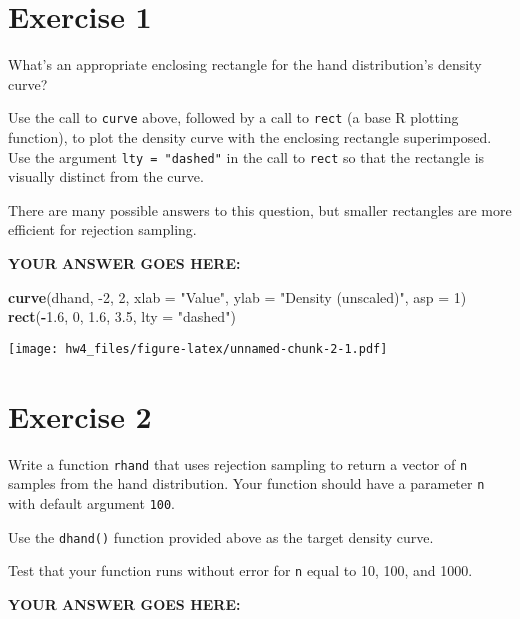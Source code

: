 \documentclass[
]{article}
\newenvironment{Shaded}{\begin{snugshade}}{\end{snugshade}}
\newcommand{\DataTypeTok}[1]{\textcolor[rgb]{0.13,0.29,0.53}{#1}}
\newcommand{\DecValTok}[1]{\textcolor[rgb]{0.00,0.00,0.81}{#1}}
\newcommand{\FloatTok}[1]{\textcolor[rgb]{0.00,0.00,0.81}{#1}}
\newcommand{\KeywordTok}[1]{\textcolor[rgb]{0.13,0.29,0.53}{\textbf{#1}}}
\newcommand{\NormalTok}[1]{#1}
\newcommand{\OperatorTok}[1]{\textcolor[rgb]{0.81,0.36,0.00}{\textbf{#1}}}
\newcommand{\StringTok}[1]{\textcolor[rgb]{0.31,0.60,0.02}{#1}}
\begin{document}
\hypertarget{exercise-1}{%
\section{Exercise 1}\label{exercise-1}}

What's an appropriate enclosing rectangle for the hand distribution's
density curve?

Use the call to \texttt{curve} above, followed by a call to
\texttt{rect} (a base R plotting function), to plot the density curve
with the enclosing rectangle superimposed. Use the argument
\texttt{lty\ =\ "dashed"} in the call to \texttt{rect} so that the
rectangle is visually distinct from the curve.

There are many possible answers to this question, but smaller rectangles
are more efficient for rejection sampling.

\textbf{YOUR ANSWER GOES HERE:}

\begin{Shaded}
\begin{Highlighting}[]
\KeywordTok{curve}\NormalTok{(dhand, }\DecValTok{{-}2}\NormalTok{, }\DecValTok{2}\NormalTok{, }\DataTypeTok{xlab =} \StringTok{"Value"}\NormalTok{, }\DataTypeTok{ylab =} \StringTok{"Density (unscaled)"}\NormalTok{, }\DataTypeTok{asp =} \DecValTok{1}\NormalTok{)}
\KeywordTok{rect}\NormalTok{(}\OperatorTok{{-}}\FloatTok{1.6}\NormalTok{, }\DecValTok{0}\NormalTok{, }\FloatTok{1.6}\NormalTok{, }\FloatTok{3.5}\NormalTok{, }\DataTypeTok{lty =} \StringTok{"dashed"}\NormalTok{)}
\end{Highlighting}
\end{Shaded}

\texttt{[image: hw4\_files/figure-latex/unnamed-chunk-2-1.pdf]}

\hypertarget{exercise-2}{%
\section{Exercise 2}\label{exercise-2}}

Write a function \texttt{rhand} that uses rejection sampling to return a
vector of \texttt{n} samples from the hand distribution. Your function
should have a parameter \texttt{n} with default argument \texttt{100}.

Use the \texttt{dhand()} function provided above as the target density
curve.

Test that your function runs without error for \texttt{n} equal to 10,
100, and 1000.

\textbf{YOUR ANSWER GOES HERE:}
\end{document}
